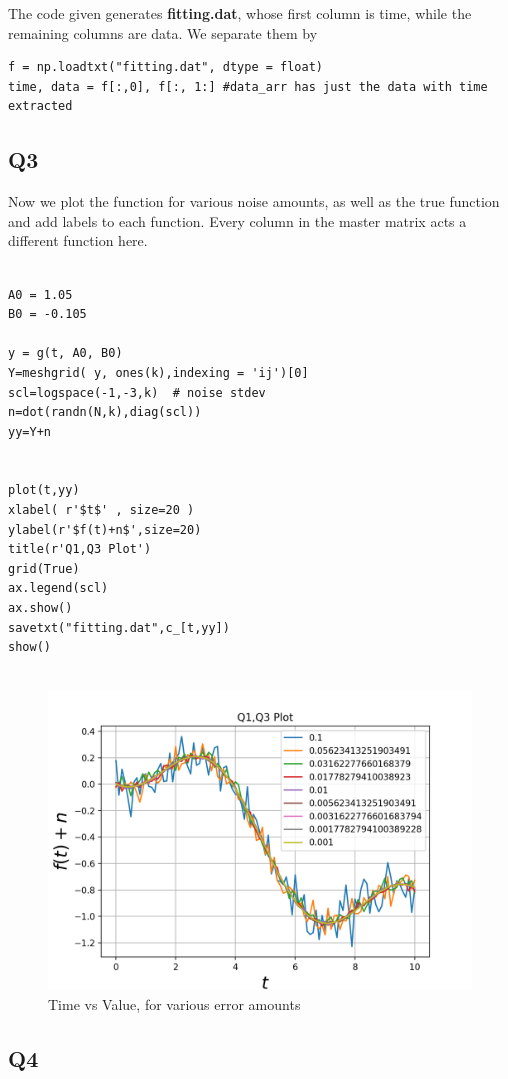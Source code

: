 \documentclass[12pt, a4paper]{report}
\begin{document}
The code given generates \textbf{fitting.dat}, whose first column is time, while the remaining columns are data. We separate them by

\begin{Verbatim}
f = np.loadtxt("fitting.dat", dtype = float)
time, data = f[:,0], f[:, 1:] #data_arr has just the data with time extracted
\end{Verbatim}
\subsection{Q3}
Now we plot the function for various noise amounts, as well as the true function and add labels to each function. Every column in the master matrix acts a  different function here.
\begin{Verbatim}

A0 = 1.05
B0 = -0.105

y = g(t, A0, B0)
Y=meshgrid( y, ones(k),indexing = 'ij')[0] 
scl=logspace(-1,-3,k)  # noise stdev
n=dot(randn(N,k),diag(scl))
yy=Y+n    


plot(t,yy)
xlabel( r'$t$' , size=20 )
ylabel(r'$f(t)+n$',size=20)
title(r'Q1,Q3 Plot')
grid(True)
ax.legend(scl)
ax.show() 
savetxt("fitting.dat",c_[t,yy]) 
show()


\end{Verbatim}


\begin{figure}[!tbh]
   	\centering
   	\includegraphics[scale=0.5]{Qn3.png}
   	\caption{Time vs Value, for various error amounts}
   	\label{fig:allgraphs}
   \end{figure} 

 \subsection{Q4}
 
\end{document}
